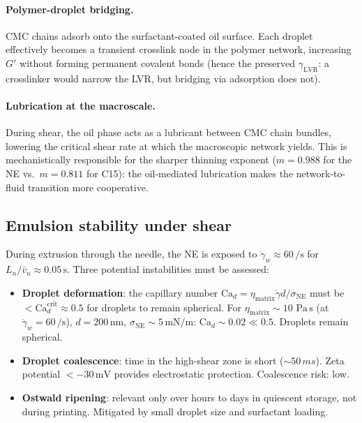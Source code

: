 \documentclass[11pt,a4paper]{article}
\newcommand{\gd}{\dot{\gamma}}
\newcommand{\Pas}{\,\mathrm{Pa\,s}}
\newcommand{\Ca}{\mathrm{Ca}}
\begin{document}
\paragraph{Polymer-droplet bridging.} CMC chains adsorb onto the
surfactant-coated oil surface. Each droplet effectively becomes a
transient crosslink node in the polymer network, increasing $G'$
without forming permanent covalent bonds (hence the preserved
$\gamma_\mathrm{LVR}$: a crosslinker would narrow the LVR, but
bridging via adsorption does not).

\paragraph{Lubrication at the macroscale.} During shear, the oil phase
acts as a lubricant between CMC chain bundles, lowering the critical
shear rate at which the macroscopic network yields. This is mechanistically
responsible for the sharper thinning exponent ($m=0.988$ for the NE
vs.\ $m=0.811$ for C15): the oil-mediated lubrication makes the
network-to-fluid transition more cooperative.

\subsection{Emulsion stability under shear}

During extrusion through the needle, the NE is exposed to
$\gd_w\approx 60\,\si{\per\s}$ for $L_n/\bar v_n\approx 0.05\,\si{\s}$.
Three potential instabilities must be assessed:

\begin{itemize}[leftmargin=1.6em,itemsep=2pt]
\item \textbf{Droplet deformation}: the capillary number
  $\Ca_d=\eta_\mathrm{matrix}\gd d/\sigma_\mathrm{NE}$ must be
  $<\Ca_d^\mathrm{crit}\approx 0.5$ for droplets to remain spherical.
  For $\eta_\mathrm{matrix}\sim 10\,\Pas$ (at $\gd_w=60\,\si{\per\s}$),
  $d=200\,\si{\nm}$, $\sigma_\mathrm{NE}\sim 5\,\si{\mN/\m}$:
  $\Ca_d\sim 0.02\ll 0.5$. Droplets remain spherical.
\item \textbf{Droplet coalescence}: time in the high-shear zone is
  short ($\sim 50\,\si{ms}$). Zeta potential $<-30\,\si{\mV}$ provides
  electrostatic protection. Coalescence risk: low.
\item \textbf{Ostwald ripening}: relevant only over hours to days in
  quiescent storage, not during printing. Mitigated by small droplet
  size and surfactant loading.
\end{itemize}
\end{document}
